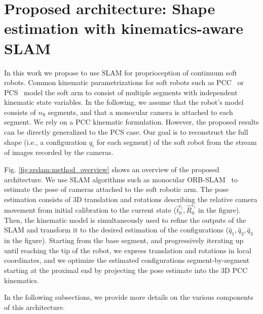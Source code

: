 \section{Proposed architecture: Shape estimation with kinematics-aware SLAM}
\label{sec:srslam:pose_estimation}

In this work we propose to use \gls{SLAM} for proprioception of continuum soft robots. Common kinematic parametrizations for soft robots such as \gls{PCC}~\cite{webster2010design} or \gls{PCS}~\cite{renda2018discrete} model the soft arm to consist of multiple segments with independent kinematic state variables. 
In the following, we assume that the robot's model consists of $n_{\mathrm{S}}$ segments, and that a monocular camera is attached to each segment. We rely on a \gls{PCC} kinematic formulation. However, the proposed results can be directly generalized to the PCS case.
%
%
Our goal is to reconstruct the full shape (i.e., a configuration $q_i$ for each segment) of the soft robot from the stream of images recorded by the cameras.

Fig. \ref{fig:srslam:method_overview} shows an overview of the proposed architecture.
%
We use \gls{SLAM} algorithms such as monocular ORB-SLAM~\cite{mur2017orb} to estimate the pose of cameras attached to the soft robotic arm.  The pose estimation consists of 3D translation and rotations describing the relative camera movement from initial calibration to the current state ($\hat{t}_0^{\mathrm{c}_i},\hat{R}_0^{\mathrm{c}_i}$ in the figure). Then, the kinematic model is simultaneously used to refine the outputs of the SLAM and transform it to the desired estimation of the configurations ($\hat{q}_1,\hat{q}_3,\hat{q}_3$ in the figure). Starting from the base segment, and progressively iterating up until reaching the tip of the robot, we express translation and rotations in local coordinates, and we optimize the estimated configurations segment-by-segment starting at the proximal end by projecting the pose estimate into the 3D \gls{PCC} kinematics.

In the following subsections, we provide more details on the various components of this architecture.

